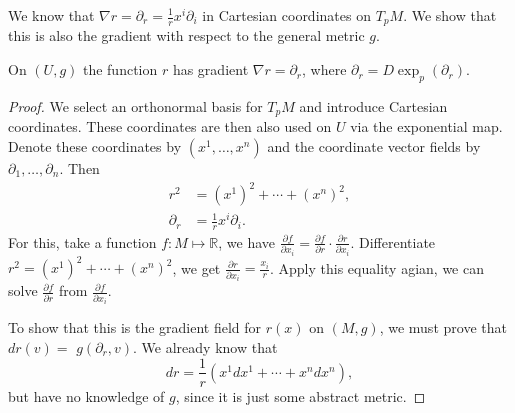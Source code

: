We know that \( \nabla r = \partial _ { r } = \frac { 1 } { r } x ^ { i } \partial _ { i } \) in Cartesian coordinates
on \( T _ { p } M . \)
We show that this is also the gradient with respect to the general metric \( g . \)

\begin{lem}
	On \( ( U , g ) \) the function \( r \) has gradient \( \nabla r = \partial _ { r } \), where \( \partial _ { r } = D \exp _ { p } \left( \partial _ { r } \right) \).
\end{lem}

\begin{proof}
	We select an orthonormal basis for \( T _ { p } M \) and introduce
	Cartesian coordinates.
	These coordinates are then also used on \( U \) via the exponential map.
	Denote these coordinates by \( \left( x ^ { 1 } , \ldots , x ^ { n } \right) \) and the coordinate vector fields by
	\( \partial _ { 1 } , \ldots , \partial _ { n } . \)
	Then
	\begin{align*}
		r ^ { 2 }        & = \left( x ^ { 1 } \right) ^ { 2 } + \cdots + \left( x ^ { n } \right) ^ { 2 } , \\
		\partial _ { r } & = \frac { 1 } { r } x ^ { i } \partial _ { i }.
	\end{align*}
	For this, take a function $f: M \mapsto \mathbb{R}$, we have $ \frac{\partial f}{\partial x_i}=\frac{\partial f}{\partial r}\cdot \frac{\partial r}{\partial x_i}$.
	Differentiate $ r ^ { 2 } = \left( x ^ { 1 } \right) ^ { 2 } + \cdots + \left( x ^ { n } \right) ^ { 2 } $, we get $\frac{\partial r}{\partial x_i} = \frac{x_i}{r} $.
	Apply this equality agian, we can solve $\frac{\partial f}{\partial r}$ from $\frac{\partial f}{\partial x_i}$.

	To show that this is the gradient field for \( r ( x ) \) on \( ( M , g ) \), we must prove that \( d r ( v ) = \)
	\( g \left( \partial _ { r } , v \right) . \)
	We already know that
	\[
		d r = \frac { 1 } { r } \left( x ^ { 1 } d x ^ { 1 } + \cdots + x ^ { n } d x ^ { n } \right),
	\]
	but have no knowledge of $g$, since it is just some abstract metric.


\end{proof}
